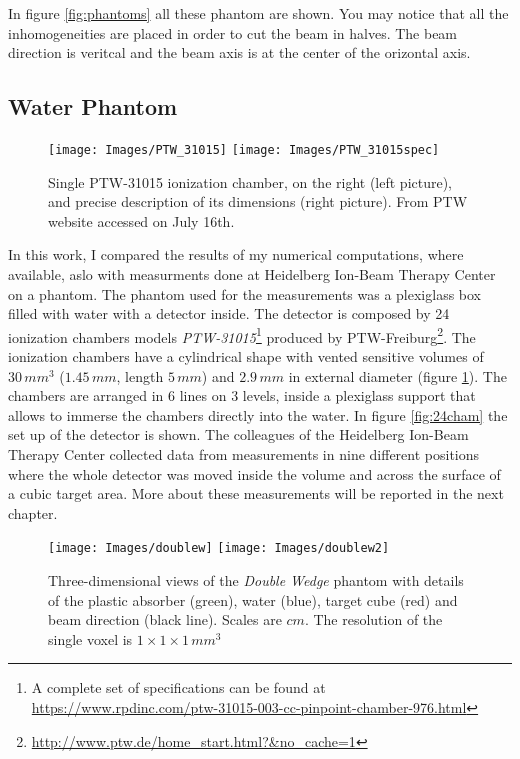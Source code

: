 \documentclass[12pt, a4paper, twoside]{book}
\begin{document}
In figure \ref{fig:phantoms} all these phantom are shown. You may notice that all the inhomogeneities are placed in order to cut the beam in halves. The beam direction is veritcal and the beam axis is at the center of the orizontal axis.


\subsection{Water Phantom}
\begin{figure}[h]
{\texttt{[image: Images/PTW\_31015]}}
{\texttt{[image: Images/PTW\_31015spec]}}
\caption{Single PTW-31015 ionization chamber, on the right (left picture), and precise description of its dimensions (right picture). From PTW website accessed on July 16th.}
\label{fig:31015}
\end{figure}
In this work, I compared the results of my numerical computations, where available, aslo with measurments done at Heidelberg Ion-Beam Therapy Center on a phantom. The phantom used for the measurements was a plexiglass box filled with water with a detector inside. The detector is composed by 24 ionization chambers models \emph{PTW-31015}\footnote{A complete set of specifications can be found at \url{https://www.rpdinc.com/ptw-31015-003-cc-pinpoint-chamber-976.html}} produced by PTW-Freiburg\footnote{\url{http://www.ptw.de/home_start.html?&no_cache=1}}. The ionization chambers have a cylindrical shape with vented sensitive volumes of $30\,mm^3$ ($1.45\,mm$, length $5\,mm$) and $2.9\,mm$ in external diameter (figure \ref{fig:31015}).
The chambers are arranged in 6 lines on 3 levels, inside a plexiglass support that allows to immerse the chambers directly into the water. In figure \ref{fig:24cham} the set up of the detector is shown.
The colleagues of the Heidelberg Ion-Beam Therapy Center collected data from measurements in nine different positions where the whole detector was moved inside the volume and across the surface of a cubic target area. More about these measurements will be reported in the next chapter.

\begin{figure}[h]
{\texttt{[image: Images/doublew]}}
{\texttt{[image: Images/doublew2]}}
\caption{Three-dimensional views of the \emph{Double Wedge} phantom with details of the plastic absorber (green), water (blue), target cube (red) and beam direction (black line). Scales are $cm$. The resolution of the single voxel is $1\times1\times1\,mm^3$}
\label{fig:doublew}
\end{figure}
\end{document}

